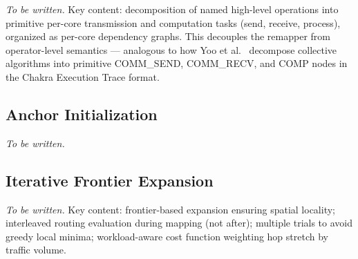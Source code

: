\documentclass[sigplan,anonymous,review,nonacm]{acmart}
\begin{document}

\emph{To be written.}
Key content: decomposition of named high-level operations into primitive per-core transmission and computation tasks (send, receive, process), organized as per-core dependency graphs. This decouples the remapper from operator-level semantics --- analogous to how Yoo et al.~\cite{yoo2025standardized} decompose collective algorithms into primitive COMM\_SEND, COMM\_RECV, and COMP nodes in the Chakra Execution Trace format.


\subsection{Anchor Initialization}
\label{sec:design-anchor}


\emph{To be written.}


\subsection{Iterative Frontier Expansion}
\label{sec:design-frontier}

%

\emph{To be written.}
Key content: frontier-based expansion ensuring spatial locality; interleaved routing evaluation during mapping (not after); multiple trials to avoid greedy local minima; workload-aware cost function weighting hop stretch by traffic volume.
\end{document}
